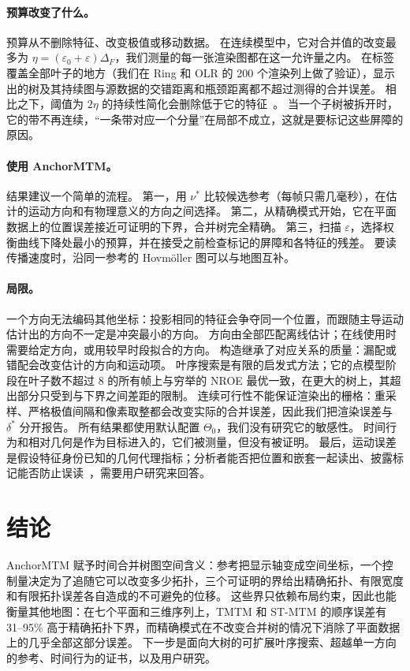 \documentclass[fontset=none,zihao=5,a4paper]{ctexart}
\begin{document}
\paragraph{预算改变了什么。}
预算从不删除特征、改变极值或移动数据。
在连续模型中，它对合并值的改变最多为 $\eta=(\varepsilon_0+\varepsilon)\Delta_F$，我们测量的每一张渲染图都在这一允许量之内。
在标签覆盖全部叶子的地方（我们在 Ring 和 OLR 的 200 个渲染列上做了验证），显示出的树及其持续图与源数据的交错距离和瓶颈距离都不超过测得的合并误差。
相比之下，阈值为 $2\eta$ 的持续性简化会删除低于它的特征~\cite{Edelsbrunner:2002:TPS,Tierny:2012:GTS}。
当一个子树被拆开时，它的带不再连续，“一条带对应一个分量”在局部不成立，这就是要标记这些屏障的原因。

\paragraph{使用 AnchorMTM。}
结果建议一个简单的流程。
第一，用 $\nu^*$ 比较候选参考（每帧只需几毫秒），在估计的运动方向和有物理意义的方向之间选择。
第二，从精确模式开始，它在平面数据上的位置误差接近可证明的下界，合并树完全精确。
第三，扫描 $\varepsilon$，选择权衡曲线下降处最小的预算，并在接受之前检查标记的屏障和各特征的残差。
要读传播速度时，沿同一参考的 Hovm\"oller 图可以与地图互补。

\paragraph{局限。}
一个方向无法编码其他坐标：投影相同的特征会争夺同一个位置，而跟随主导运动估计出的方向不一定是冲突最小的方向。
方向由全部匹配离线估计；在线使用时需要给定方向，或用较早时段拟合的方向。
构造继承了对应关系的质量：漏配或错配会改变估计的方向和运动项。
叶序搜索是有限的启发式方法；它的点模型阶段在叶子数不超过 8 的所有帧上与穷举的 NROE 最优一致，在更大的树上，其超出部分只受到与下界之间差距的限制。
连续可行性不能保证渲染出的栅格：重采样、严格极值间隔和像素取整都会改变实际的合并误差，因此我们把渲染误差与 $\delta^*$ 分开报告。
所有结果都使用默认配置 $\Theta_0$，我们没有研究它的敏感性。
时间行为和相对几何是作为目标进入的，它们被测量，但没有被证明。
最后，运动误差是假设特征身份已知的几何代理指标；分析者能否把位置和嵌套一起读出、披露标记能否防止误读~\cite{Kamakshidasan:2021:MM,McNutt:2020:SVM}，需要用户研究来回答。

\section{结论}
AnchorMTM 赋予时间合并树图空间含义：参考把显示轴变成空间坐标，一个控制量决定为了追随它可以改变多少拓扑，三个可证明的界给出精确拓扑、有限宽度和有限拓扑误差各自造成的不可避免的位移。
这些界只依赖布局约束，因此也能衡量其他地图：在七个平面和三维序列上，TMTM 和 ST-MTM 的顺序误差有 31--95\% 高于精确拓扑下界，而精确模式在不改变合并树的情况下消除了平面数据上的几乎全部这部分误差。
下一步是面向大树的可扩展叶序搜索、超越单一方向的参考、时间行为的证书，以及用户研究。



\end{document}
